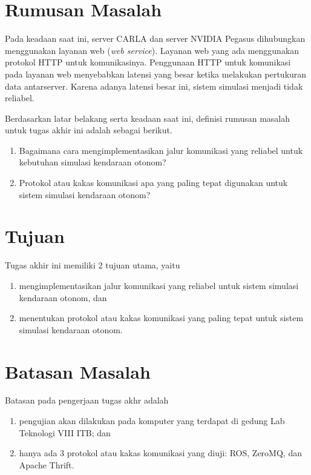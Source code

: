 \section{Rumusan Masalah}

Pada keadaan saat ini, server CARLA dan server NVIDIA Pegasus dihubungkan
menggunakan layanan web (\textit{web service}). Layanan web yang ada menggunakan
protokol HTTP untuk komunikasinya. Penggunaan HTTP untuk komunikasi pada layanan
web menyebabkan latensi yang besar ketika melakukan pertukuran data antarserver.
Karena adanya latensi besar ini, sistem simulasi menjadi tidak reliabel.

Berdasarkan latar belakang serta keadaan saat ini, definisi rumusan masalah
untuk tugas akhir ini adalah sebagai berikut.
\begin{enumerate}
	\item Bagaimana cara mengimplementasikan jalur komunikasi yang reliabel
	      untuk kebutuhan simulasi kendaraan otonom?
	\item Protokol atau kakas komunikasi apa yang paling tepat digunakan untuk
	      sistem simulasi kendaraan otonom?
\end{enumerate}

\section{Tujuan}

Tugas akhir ini memiliki 2 tujuan utama, yaitu
\begin{enumerate}
	\item mengimplementasikan jalur komunikasi yang reliabel untuk sistem
	      simulasi kendaraan otonom, dan
	\item menentukan protokol atau kakas komunikasi yang paling tepat untuk
	      sistem simulasi kendaraan otonom.
\end{enumerate}

\section{Batasan Masalah}

Batasan pada pengerjaan tugas akhr adalah

\begin{enumerate}
	\item pengujian akan dilakukan pada komputer yang terdapat di gedung Lab
	      Tek\-no\-lo\-gi VIII ITB; dan
	\item hanya ada 3 protokol atau kakas komunikasi yang diuji: ROS, ZeroMQ,
	      dan Apache Thrift.
\end{enumerate}

